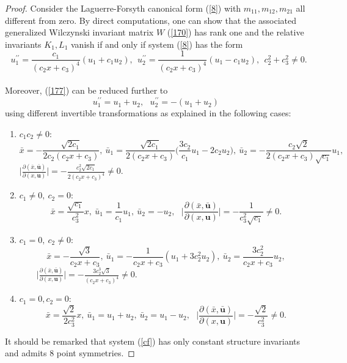 \documentclass[12pt]{article}
\begin{document}
\begin{proof}
Consider the Laguerre-Forsyth canonical form (\ref{8}) with $m_{11},m_{12},m_{21}$ all different from zero. By direct computations, one can show that the associated  generalized Wilczynski invariant matrix $W$ (\ref{170}) has rank one and the relative invariants $K_1,L_1$ vanish if and only if system (\ref{8}) has the form
\begin{equation}\label{177}
u_1^{\prime\prime}=\frac{c_1}{(c_2x+c_3)^4}(u_1+c_1u_2),~~u_2^{\prime\prime}=\frac{1}{(c_2x+c_3)^4}(u_1-c_1u_2), ~~c_2^2+c_3^2\neq0.
\end{equation} \\
Moreover, (\ref{177}) can be reduced further to 
\begin{equation}\label{178}
u_1^{\prime\prime}=u_1+u_2,~~~u_2^{\prime\prime}=-(u_1+u_2)~~~
\end{equation}
using different invertible transformations as explained in the following cases:
\begin{enumerate}
\item[(i)]  $c_1c_2\neq0$:
$$\bar{x}=-\frac{\sqrt{2c_1}}{2c_2(c_2x+c_3)},~\bar{u}_1=\frac{\sqrt{2c_1}}{2(c_2x+c_3)}\bigg(\frac{3c_2}{c_1}u_1-2c_2u_2\bigg),~\bar{u}_2=-\frac{c_2\sqrt{2}}{2(c_2x+c_3)\sqrt{c_1}}u_1,$$
 $\bigg|\frac{\partial (\bar{x},\bar{\textbf{u}})}{\partial (x,\textbf{u})}\bigg|=-\frac{c_2^2\sqrt{2c_1}}{2(c_2x+c_3)^4}\neq0.$\\
\item[(ii)] $c_1\neq0,~c_2=0$:
$$\bar{x}=\frac{\sqrt{c_1}}{c_3^2}x,~\bar{u}_1=\frac{1}{c_1}u_1,~\bar{u}_2=-u_2, ~~~\bigg|\frac{\partial (\bar{x},\bar{\textbf{u}})}{\partial (x,\textbf{u})}\bigg|=-\frac{1}{c_3^2\sqrt{c_1}}\neq0.$$ 
\item[(iii)] $c_1=0,~c_2\neq0$:
$$\bar{x}=-\frac{\sqrt{3}}{c_2x+c_3},~\bar{u}_1=-\frac{1}{c_2x+c_3}(u_1+3c_2^2u_2),~\bar{u}_2=\frac{3c_2^2}{c_2x+c_3}u_2,$$
~~~~$\bigg|\frac{\partial (\bar{x},\bar{\textbf{u}})}{\partial (x,\textbf{u})}\bigg|=-\frac{3c_2^3\sqrt{3}}{(c_2x+c_3)^4}\neq0.$
\item[(iv)] $c_1=0, c_2=0$:
$$\bar{x}=\frac{\sqrt{2}}{2c_3^2}x,~\bar{u}_1=u_1+u_2,~\bar{u}_2=u_1-u_2,~~~\bigg|\frac{\partial (\bar{x},\bar{\textbf{u}})}{\partial (x,\textbf{u})}\bigg|=-\frac{\sqrt{2}}{c_3^2}\neq0.$$
\end{enumerate}
It should be remarked that system (\ref{cf}) has only constant structure invariants and admits 8 point symmetries. 

\end{proof}
\end{document}
